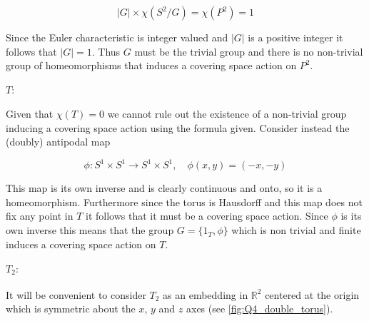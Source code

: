 \documentclass{article}
\begin{document}
\begin{equation*}
    |G| \times \chi(S^2/G) = \chi(P^2) = 1
\end{equation*}

Since the Euler characteristic is integer valued and $|G|$ is a positive integer it follows that 
$|G| = 1$. Thus $G$ must be the trivial group and there is no non-trivial group of homeomorphisms 
that induces a covering space action on $P^2$.

\paragraph{$T:$}
Given that $\chi(T) = 0$ we cannot rule out the existence of a non-trivial group inducing a 
covering space action using the formula given. Consider instead the (doubly) antipodal map 

\begin{equation*}
    \phi:S^1\times S^1 \rightarrow S^1 \times S^1, \quad \phi(x,y) = (-x,-y)
\end{equation*}

This map is its own inverse and is clearly continuous and onto, so it is a homeomorphism. 
Furthermore since the torus is Hausdorff and this map does not fix any point in $T$ 
it follows that it must be a covering space action. Since $\phi$ is its own inverse this 
means that the group $G = \{1_T,\phi\}$ which is non trivial and finite induces a covering space action on $T$. 

\paragraph{$T_2:$}
It will be convenient to consider $T_2$ as an embedding in $\mathbb{R}^2$ centered at the 
origin which is symmetric about the $x$, $y$ and $z$ axes (see \autoref{fig:Q4_double_torus}). 
\end{document}
